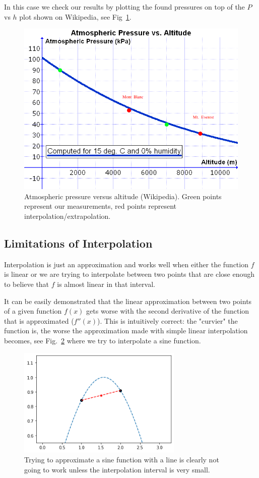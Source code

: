 In this case we check our results by plotting the found pressures on top of the $P$ vs $h$ plot shown on Wikipedia, see Fig~\ref{fig:Pvsh}.

\begin{figure}
\centering
\includegraphics[width=0.7\linewidth]{figures/Atmospheric_Pressure_vs._Altitude.png}
\caption{Atmospheric pressure versus altitude (Wikipedia). Green points
represent our measurements, red points represent
interpolation/extrapolation.}
\label{fig:Pvsh}
\end{figure}

\subsection{Limitations of Interpolation}
Interpolation is just an approximation and works well when either the function $f$ is linear or we are trying to interpolate between two points that are close enough to believe that $f$ is almost linear in that interval.

It can be easily demonstrated that the linear approximation between two points of a given function $f(x)$ gets worse with the second derivative of the function that is approximated ($f''(x)$). This is intuitively correct: the "curvier" the function is, the worse the approximation made with simple linear interpolation becomes, see Fig.~\ref{fig:sine_interp} where we try to interpolate a sine function.

\begin{figure}
  \centering
  \includegraphics[width=0.7\textwidth]{figures/wrong_interp.png}
  \caption{Trying to approximate a sine function with a line is clearly not going to work unless the interpolation interval is very small.}
  \label{fig:sine_interp}
\end{figure}

